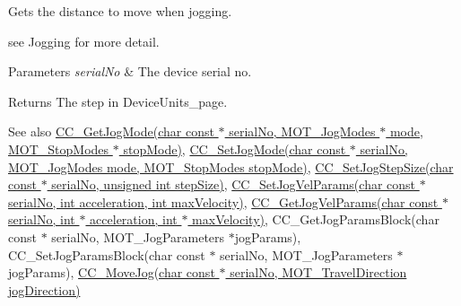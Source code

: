 Gets the distance to move when jogging. 

see Jogging for more detail.


\begin{DoxyParams}{Parameters}
{\em serial\+No} & The device serial no. \\
\hline
\end{DoxyParams}
\begin{DoxyReturn}{Returns}
The step in Device\+Units\+\_\+page. 
\end{DoxyReturn}
\begin{DoxySeeAlso}{See also}
\hyperlink{group___k_cube_d_c_servo_gaedfce16951a36423bd67cec88d8aee00}{C\+C\+\_\+\+Get\+Jog\+Mode(char const $\ast$ serial\+No, M\+O\+T\+\_\+\+Jog\+Modes $\ast$ mode, M\+O\+T\+\_\+\+Stop\+Modes $\ast$ stop\+Mode)}, \hyperlink{group___k_cube_d_c_servo_gadbac7a9d5c2f6ce7c59b853075139999}{C\+C\+\_\+\+Set\+Jog\+Mode(char const $\ast$ serial\+No, M\+O\+T\+\_\+\+Jog\+Modes mode, M\+O\+T\+\_\+\+Stop\+Modes stop\+Mode)}, \hyperlink{group___k_cube_d_c_servo_ga1d986216045157d086ab1c9f80b9d461}{C\+C\+\_\+\+Set\+Jog\+Step\+Size(char const $\ast$ serial\+No, unsigned int step\+Size)}, \hyperlink{group___k_cube_d_c_servo_ga6fca67412dd838f9d4b94922379e7e59}{C\+C\+\_\+\+Set\+Jog\+Vel\+Params(char const $\ast$ serial\+No, int acceleration, int max\+Velocity)}, \hyperlink{group___k_cube_d_c_servo_gad5bd91c34f134307376145710c1a4c5b}{C\+C\+\_\+\+Get\+Jog\+Vel\+Params(char const $\ast$ serial\+No, int $\ast$ acceleration, int $\ast$ max\+Velocity)}, C\+C\+\_\+\+Get\+Jog\+Params\+Block(char const $\ast$ serial\+No, M\+O\+T\+\_\+\+Jog\+Parameters $\ast$jog\+Params), C\+C\+\_\+\+Set\+Jog\+Params\+Block(char const $\ast$ serial\+No, M\+O\+T\+\_\+\+Jog\+Parameters $\ast$jog\+Params), \hyperlink{group___k_cube_d_c_servo_ga6c01ce3d8b2bb0c3d958f179c34635b1}{C\+C\+\_\+\+Move\+Jog(char const $\ast$ serial\+No, M\+O\+T\+\_\+\+Travel\+Direction jog\+Direction)}


\end{DoxySeeAlso}

\begin{DoxyCodeInclude}
\end{DoxyCodeInclude}
